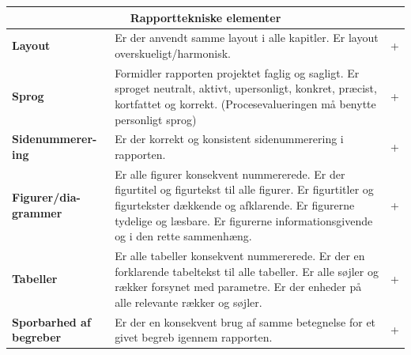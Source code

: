 \begin{longtable}{|p{30mm}|p{90mm}|p{25mm}|}
\hline
\multicolumn{3}{|c|}{\textbf{Rapporttekniske elementer}} \\ \hline

\textbf{Layout} & Er der anvendt samme layout i alle kapitler. 
Er layout overskueligt/harmonisk.
                                        &    +       \\ \hline

\textbf{Sprog} & Formidler rapporten projektet faglig og sagligt.
Er sproget  neutralt, aktivt, upersonligt, konkret, præcist, kortfattet og korrekt.
(Procesevalueringen må benytte personligt sprog)
                                        &       +    \\ \hline

\textbf{Sidenummerer-ing} & Er der korrekt og konsistent sidenummerering i rapporten. 
                                        &   + \\ \hline

\textbf{Figurer/dia-grammer} & Er alle figurer konsekvent nummererede.
Er der figurtitel og figurtekst til alle figurer.
Er figurtitler og figurtekster dækkende og afklarende.
Er figurerne tydelige og læsbare.
Er figurerne informationsgivende og i den rette sammenhæng.
                                        &    +       \\ \hline

\textbf{Tabeller} & Er alle tabeller konsekvent nummererede.
Er der en forklarende tabeltekst til alle tabeller.
Er alle søjler og rækker forsynet med parametre.
Er der enheder på alle relevante rækker og søjler.
                                        &    +       \\ \hline

\textbf{Sporbarhed af begreber} & Er der en konsekvent brug af samme betegnelse for et givet begreb igennem rapporten. 
                                        &      +     \\ \hline



\end{longtable}

